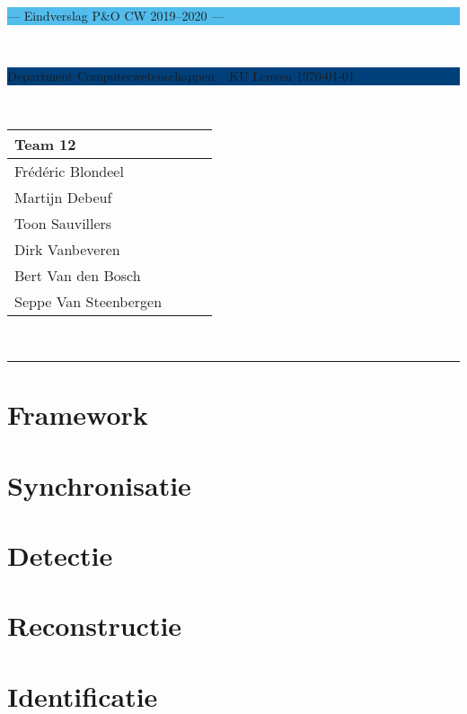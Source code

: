 \documentclass[a4paper,11pt]{article}
\begin{document}
\noindent
\colorbox[HTML]{52BDEC}{\bfseries\parbox{\textwidth}{\centering\large
--- Eindverslag P\&O CW 2019--2020 ---
}}
\\[-1mm]
\colorbox[HTML]{00407A}{\bfseries\color{white}\parbox{\textwidth}{
Department Computerwetenschappen -- KU Leuven
\hfill
\today
}}
\\

\smallskip

\noindent

\begin{tabular}{*4l}
\toprule
\multicolumn{2}{l}{\large\textbf{Team 12}} \\
\midrule
Frédéric Blondeel &\\
Martijn Debeuf &\\
Toon Sauvillers &\\ %
Dirk Vanbeveren  &\\
Bert Van den Bosch & \\
Seppe Van Steenbergen &\\


\bottomrule
\hline
\end{tabular}\\

\noindent
{\color[HTML]{52BDEC} \rule{\linewidth}{1mm} }
\tableofcontents
\newpage



\section{Framework}\label{sec:framework}


\section{Synchronisatie}\label{sec:synchronisatie}


\section{Detectie}\label{sec:detectie}


\section{Reconstructie}\label{sec:reconstructie}


\section{Identificatie}\label{sec:identificatie}









\newpage


\end{document}
